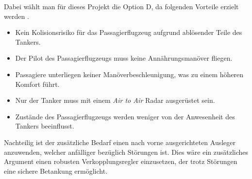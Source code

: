 Dabei wählt man für dieses Projekt die Option D, da folgenden Vorteile erzielt werden \cite{RefuelingTime}.
\begin{itemize}
    \item Kein Kolisionsrisiko für das Passagierflugzeug aufgrund ablösender Teile des Tankers.
    \item Der Pilot des Passagierflugzeugs muss keine Annährungsmanöver fliegen.
    \item Passagiere unterliegen keiner Manöverbeschleunigung, was zu einem höheren Komfort führt.
    \item Nur der Tanker muss mit einem \textit{Air to Air} Radar ausgerüstet sein.
    \item Zustände des Passagierflugzeugs werden weniger von der Anwesenheit des Tankers beeinflusst.
\end{itemize}
Nachteilig ist der zusätzliche Bedarf einen nach vorne ausgerichteten Ausleger anzuwenden, welcher anfälliger bezüglich Störungen ist. Dies wäre ein zusätzliches Argument einen robusten Verkopplungsregler einzusetzen, der trotz Störungen eine sichere Betankung ermöglicht.
